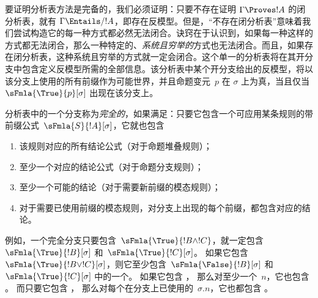 \documentclass[../../../include/open-logic-section]{subfiles}
\begin{document}


\begin{explain}
  要证明分析表方法是完备的，我们必须证明：只要不存在证明 $\Gamma \Proves
  !A$ 的闭分析表，就有 $\Gamma \Entails/ !A$，即存在反模型。但是，“不存在闭分析表”意味着我们尝试构造它的每一种方式都必然无法闭合。诀窍在于认识到，如果每一种这样的方式都无法闭合，那么一种特定的、\emph{系统且穷举的}方式也无法闭合。而且，如果存在闭分析表，这种系统且穷举的方式就一定会闭合。这个单一的分析表将在其开分支中包含定义反模型所需的全部信息。该分析表中某个开分支给出的反模型，将以该分支上使用的所有前缀作为可能世界，并且命题变元~$p$ 在 $\sigma$ 上为真，当且仅当 $\sFmla{\True}{p}[\sigma]$ 出现在该分支上。
\end{explain}

\begin{defn}
  分析表中的一个分支称为\emph{完全的}，如果满足：只要它包含一个可应用某条规则的带前缀公式~$\sFmla{S}{!A}[\sigma]$，它就也包含
  \begin{enumerate}
    \item 该规则对应的所有结论公式（对于命题堆叠规则）；
    \item 至少一个对应的结论公式（对于命题分支规则）；
    \item 至少一个可能的结论（对于需要新前缀的模态规则）；
    \item 对于需要已使用前缀的模态规则，对分支上出现的每个前缀，都包含对应的结论。
  \end{enumerate}
\end{defn}

\begin{explain}
例如，一个完全分支只要包含~$\sFmla{\True}{!B
  \land !C}$，就一定包含~$\sFmla{\True}{!B}[\sigma]$ 和~$\sFmla{\True}{!C}[\sigma]$。
如果它包含~$\sFmla{\True}{!B \lor !C}[\sigma]$，则它至少包含~$\sFmla{\False}{!B}[\sigma]$ 和~$\sFmla{\True}{!C}[\sigma]$ 中的一个。
如果它包含 ，
那么对至少一个~$n$，它也包含 。
而只要它包含 ，
那么对每个在分支上已使用的~$\sigma.n$，它也都包含 。
\end{explain}
\end{document}
